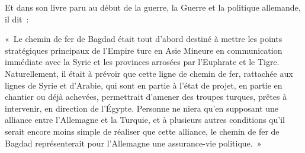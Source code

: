 \documentclass[french,twoside]{book} %
\newenvironment{quoteblock}%
  {\begin{quoting}}
  {\end{quoting}}
\newenvironment{quotebar}{%
    \def\FrameCommand{{\color{rubric!10!}\vrule width 0.5em} \hspace{0.9em}}%
    \def\OuterFrameSep{\itemsep} %
    \MakeFramed {\advance\hsize-\width \FrameRestore}
  }%
  {%
    \endMakeFramed
  }
\renewenvironment{quoteblock}%
  {%
    \savenotes
    \setstretch{0.9}
    \normalfont
    \begin{quotebar}
  }
  {%
    \end{quotebar}
    \spewnotes
  }
\begin{document}
\noindent Et dans son livre paru au début de la guerre, la Guerre et la politique allemande, il dit :\par

\begin{quoteblock}
 \noindent « Le chemin de fer de Bagdad était tout d’abord destiné à mettre les points stratégiques principaux de l’Empire turc en Asie Mineure en communication immédiate avec la Syrie et les provinces arrosées par l’Euphrate et le Tigre. Naturellement, il était à prévoir que cette ligne de chemin de fer, rattachée aux lignes de Syrie et d’Arabie, qui sont en partie à l’état de projet, en partie en chantier ou déjà achevées, permettrait d’amener des troupes turques, prêtes à intervenir, en direction de l’Égypte. Personne ne niera qu’en supposant une alliance entre l’Allemagne et la Turquie, et à plusieurs autres conditions qu’il serait encore moins simple de réaliser que cette alliance, le chemin de fer de Bagdad représenterait pour l’Allemagne une assurance-vie politique. »
\end{quoteblock}
\end{document}
